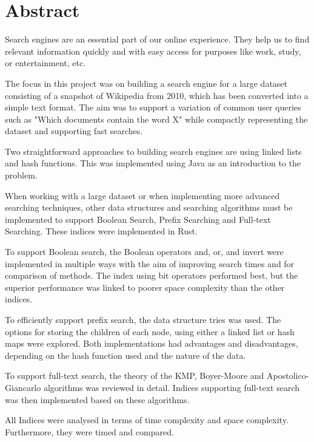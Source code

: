 \section*{Abstract}
Search engines are an essential part of our online experience. They help us to find relevant information quickly and with easy access for purposes like work, study, or entertainment, etc. 

The focus in this project was on building a search engine for a large dataset consisting of a snapshot of Wikipedia from 2010, which has been converted into a simple text format. The aim was to support a variation of common user queries such as "Which documents contain the word X" while compactly representing the dataset and supporting fast searches.

Two straightforward approaches to building search engines are using linked lists and hash functions. This was implemented using Java as an introduction to the problem. 

When working with a large dataset or when implementing more advanced searching techniques, other data structures and searching algorithms must be implemented to support Boolean Search, Prefix Searching and Full-text Searching. These indices were implemented in Rust. 

To support Boolean search, the Boolean operators and, or, and invert were implemented in multiple ways with the aim of improving search times and for comparison of methods. The index using bit operators performed best, but the superior performance was linked to poorer space complexity than the other indices. 

To efficiently support prefix search, the data structure tries was used. The options for storing the children of each node, using either a linked list or hash maps were explored. Both implementations had advantages and disadvantages, depending on the hash function used and the nature of the data. 

To support full-text search, the theory of the KMP, Boyer-Moore and Apostolico-Giancarlo algorithms was reviewed in detail. Indices supporting full-text search was then implemented based on these algorithms. 

All Indices were analysed in terms of time complexity and space complexity. Furthermore, they were timed and compared.
